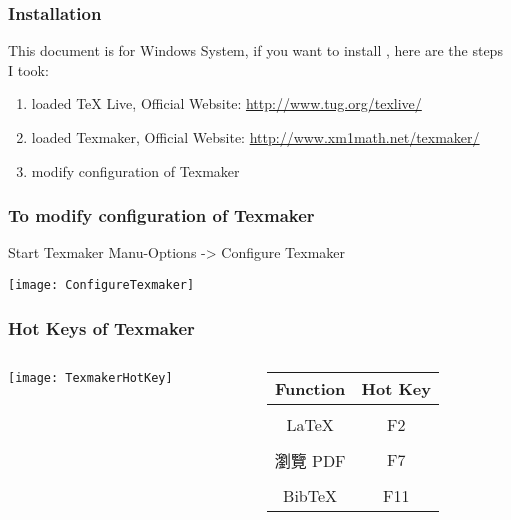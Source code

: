 	\begin{frame}[label=install]%
		\frametitle{Installation}
		This document is for Windows System, if you want to install \XeLaTeX, here are the steps I took:\newline		 
		\begin{enumerate}
			\item {loaded TeX Live, \newline
				\alert{Official Website: }\url{http://www.tug.org/texlive/}} 
			\item {loaded Texmaker, \newline
				\alert{Official Website: }\url{http://www.xm1math.net/texmaker/}}
			\item {modify configuration of Texmaker}
		\end{enumerate}
	\end{frame}

	\begin{frame}[fragile]%
		\frametitle{To modify configuration of Texmaker}
		Start Texmaker\newline
		Manu-Options -> Configure Texmaker
		\newline
		\begin{center}
		\texttt{[image: ConfigureTexmaker]}
		\end{center}
		
	\end{frame}
	
	\begin{frame}[label=TexmakerHotKey]%
		\frametitle{Hot Keys of Texmaker}
		\begin{columns}
			\begin{column}{6cm}		
				\texttt{[image: TexmakerHotKey]}
			\end{column}
			\begin{column}{4cm}
				\begin{tabular}{cc}
					Function & Hot Key\\
					\hline
					\\
					LaTeX &  F2 \\
					\\
					瀏覽 PDF & F7 \\
					\\					
					BibTeX & F11 \\
				\end{tabular}			
			\end{column}
		\end{columns}
	\end{frame}	
		
